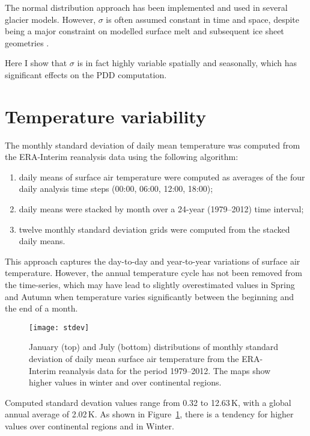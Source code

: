 \documentclass[twocolumn]{igs}
\begin{document}
The normal distribution approach has been implemented and used in several glacier models. However, $\sigma$ is often assumed constant in time and space, despite being a major constraint on modelled surface melt and subsequent ice sheet geometries \citep{charbit-etal-2013}.

Here I show that $\sigma$ is in fact highly variable spatially and seasonally, which has significant effects on the PDD computation.


\section{Temperature variability}

The monthly standard deviation of daily mean temperature was computed from the ERA-Interim reanalysis \citep{data:erai} data using the following algorithm:

\begin{enumerate}
  \item daily means of surface air temperature were computed as averages of the four daily analysis time steps (00:00, 06:00, 12:00, 18:00);
  \item daily means were stacked by month over a 24-year (1979--2012) time interval;
  \item twelve monthly standard deviation grids were computed from the stacked daily means.
\end{enumerate}

This approach captures the day-to-day and year-to-year variations of surface air temperature. However, the annual temperature cycle has not been removed from the time-series, which may have lead to slightly overestimated values in Spring and Autumn when temperature varies significantly between the beginning and the end of a month.

\begin{figure}
  \centering\texttt{[image: stdev]}
  \caption{January (top) and July (bottom) distributions of monthly standard deviation of daily mean surface air temperature from the ERA-Interim reanalysis \citep{data:erai} data for the period 1979--2012. The maps show higher values in winter and over continental regions.}
  \label{fig:stdev}
\end{figure}

Computed standard devation values range from 0.32 to 12.63\,K, with a global annual average of 2.02\,K. As shown in Figure~\ref{fig:stdev}, there is a tendency for higher values over continental regions and in Winter.
\end{document}
